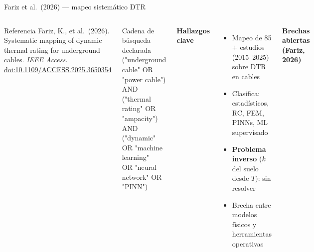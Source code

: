 \documentclass[aspectratio=169]{beamer}
\begin{document}
\begin{frame}{Fariz et al.\ (2026) --- mapeo sistemático DTR}
\begin{columns}[T]
\begin{block}{\scriptsize Referencia}
\scriptsize Fariz, K., et al.\ (2026). Systematic mapping of dynamic thermal
rating for underground cables. \textit{IEEE Access.}
\href{https://doi.org/10.1109/ACCESS.2025.3650354}{doi:10.1109/ACCESS.2025.3650354}
\end{block}

\vspace{0.15em}
\begin{block}{\scriptsize Cadena de búsqueda declarada}
\tiny\ttfamily
("underground cable" OR "power cable")\\
AND ("thermal rating" OR "ampacity")\\
AND ("dynamic" OR "machine learning"\\
\quad OR "neural network" OR "PINN")
\end{block}

\vspace{0.15em}
\textbf{\small Hallazgos clave}
\begin{itemize}[leftmargin=*,nosep]\scriptsize
  \item Mapeo de 85$+$ estudios (2015--2025) sobre DTR en cables
  \item Clasifica: estadísticos, RC, FEM, PINNs, ML supervisado
  \item \textbf{Problema inverso} ($k$ del suelo desde $T$): sin resolver
  \item Brecha entre modelos físicos y herramientas operativas
\end{itemize}

\textbf{\small Brechas abiertas (Fariz, 2026)}
\vspace{0.2em}



\end{columns}
\end{frame}
\end{document}
